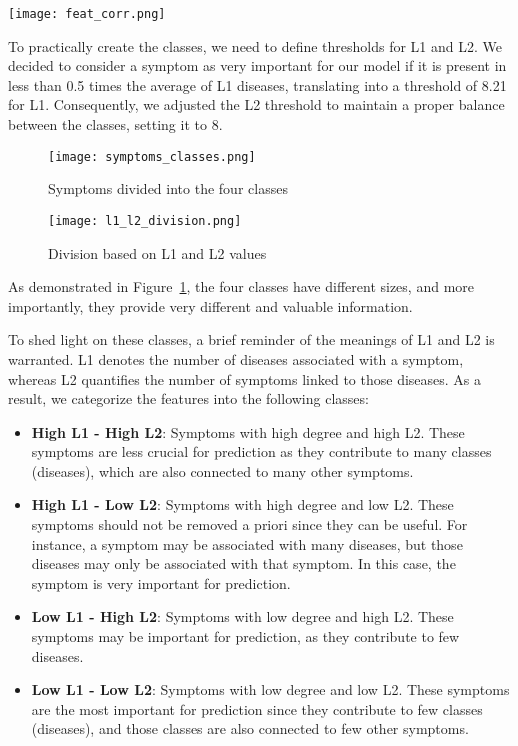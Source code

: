 \begin{figure*}[!t]
    \centering
    \texttt{[image: feat\_corr.png]}
    \caption{Correlation between features}
    \label{fig:feat_corr}
\end{figure*}

To practically create the classes, we need to define thresholds for L1 and L2. We decided to consider
a symptom as very important for our model if it is present in less than 0.5 times the average of L1 diseases,
translating into a threshold of 8.21 for L1. Consequently, we adjusted the L2 threshold to maintain a proper balance
between the classes, setting it to 8.

\begin{figure}[H]
    \centering
    \texttt{[image: symptoms\_classes.png]}
    \caption{Symptoms divided into the four classes}
    \label{fig:symptoms_classes}
\end{figure}

\begin{figure}[H]
    \centering
    \texttt{[image: l1\_l2\_division.png]}
    \caption{Division based on L1 and L2 values}
    \label{fig:l1_l2_division}
\end{figure}
\noindent


\noindent
As demonstrated in Figure~\ref{fig:symptoms_classes}, the four classes have different sizes, and more importantly,
they provide very different and valuable information.

To shed light on these classes, a brief reminder of the meanings of L1 and L2 is warranted. L1 denotes the number
of diseases associated with a symptom, whereas L2 quantifies the number of symptoms linked to those diseases.
As a result, we categorize the features into the following classes:\\

\begin{itemize}
    \setlength\itemsep{1em}
    \item \textbf{High L1 - High L2}: Symptoms with high degree and high L2. These symptoms are less crucial for
          prediction as they contribute to many classes (diseases), which are also connected to many other symptoms.
    \item \textbf{High L1 - Low L2}: Symptoms with high degree and low L2. These symptoms should not be removed a
          priori since they can be useful. For instance, a symptom may be associated with many diseases, but those
          diseases may only be associated with that symptom. In this case, the symptom is very important for prediction.
    \item \textbf{Low L1 - High L2}: Symptoms with low degree and high L2. These symptoms may be important for
          prediction, as they contribute to few diseases.
    \item \textbf{Low L1 - Low L2}: Symptoms with low degree and low L2. These symptoms are the most important
          for prediction since they contribute to few classes (diseases), and those classes are also connected to
          few other symptoms.
\end{itemize}

